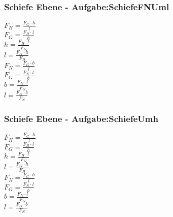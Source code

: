 \subsubsection{Schiefe Ebene - Aufgabe:SchiefeFNUml} 
\begin{minipage}{0.45\textwidth} 
$ F_{H}  = \frac{F_{G} \cdot h}{ l} $\\ 
$ F_{G}  = \frac{F_{H} \cdot l}{ h} $\\ 
$ h = \frac{F_{H} \cdot l}{ F_{G} } $\\ 
$ l = \frac{F_{G} \cdot h}{ F_{H} } $\\ 
$ F_{N}  = \frac{F_{G} \cdot b}{ l} $\\ 
$ F_{G}  = \frac{F_{N} \cdot l}{ b} $\\ 
$ b = \frac{F_{N} \cdot l}{ F_{G} } $\\ 
$ l = \frac{F_{G} \cdot b}{ F_{N} } $\\ 
\end{minipage} 
\begin{minipage}{0.45\textwidth} 
 
\end{minipage} 
\subsubsection{Schiefe Ebene - Aufgabe:SchiefeUmh} 
\begin{minipage}{0.45\textwidth} 
$ F_{H}  = \frac{F_{G} \cdot h}{ l} $\\ 
$ F_{G}  = \frac{F_{H} \cdot l}{ h} $\\ 
$ h = \frac{F_{H} \cdot l}{ F_{G} } $\\ 
$ l = \frac{F_{G} \cdot h}{ F_{H} } $\\ 
$ F_{N}  = \frac{F_{G} \cdot b}{ l} $\\ 
$ F_{G}  = \frac{F_{N} \cdot l}{ b} $\\ 
$ b = \frac{F_{N} \cdot l}{ F_{G} } $\\ 
$ l = \frac{F_{G} \cdot b}{ F_{N} } $\\ 
\end{minipage} 
\begin{minipage}{0.45\textwidth} 
 
\end{minipage} 
